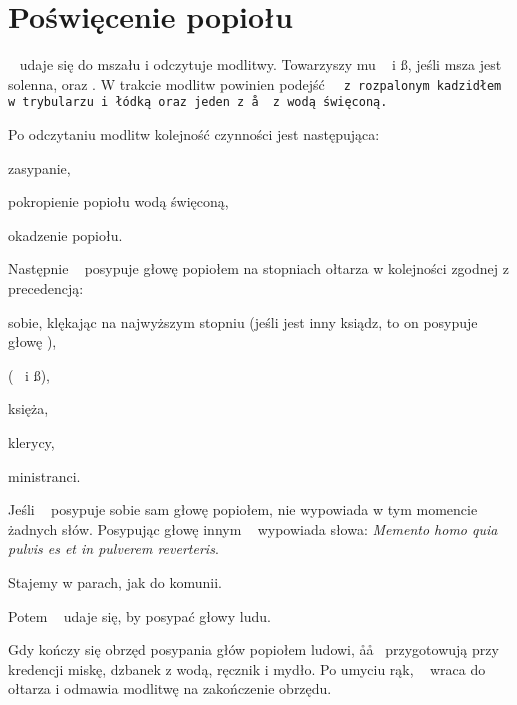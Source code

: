 \section{Poświęcenie popiołu}
\begin{itemize*}
	\item \ii~ udaje się do mszału i odczytuje modlitwy. Towarzyszy mu \dd~ i
	      \ss, jeśli msza jest solenna, oraz . W trakcie modlitw powinien
	      podejść \tt~ z rozpalonym kadzidłem w trybularzu i łódką oraz jeden
	      z \aa~ z wodą święconą.
	\item Po odczytaniu modlitw kolejność czynności jest następująca:
	      \begin{itemize*}
		      \item zasypanie,
		      \item pokropienie popiołu wodą święconą,
		      \item okadzenie popiołu.
	      \end{itemize*}
	\item Następnie \ii~ posypuje głowę popiołem na stopniach ołtarza w
	      kolejności zgodnej z precedencją:
	      \begin{itemize*}
		      \item sobie, klękając na najwyższym stopniu (jeśli jest inny ksiądz,
		            to on posypuje głowę \ii),
		      \item (\dd~ i \ss),
		      \item księża,
		      \item klerycy,
		      \item ministranci.
	      \end{itemize*}
	\item Jeśli \ii~ posypuje sobie sam głowę popiołem, nie wypowiada w tym
	      momencie żadnych słów. Posypując głowę innym \ii~ wypowiada słowa:
	      \textit{Memento homo quia pulvis es et in pulverem reverteris}.
	\item Stajemy w parach, jak do komunii.
	\item Potem \ii~ udaje się, by posypać głowy ludu.
	\item Gdy kończy się obrzęd posypania głów popiołem ludowi, \aa\aa~
	      przygotowują przy kredencji miskę, dzbanek z wodą, ręcznik i mydło. Po
	      umyciu rąk, \ii~ wraca do ołtarza i odmawia modlitwę na zakończenie
	      obrzędu.
\end{itemize*}
